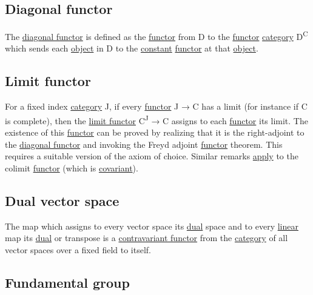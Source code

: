 \documentclass[11pt]{article}
\begin{document}
\subsection{\label{org6caafac}Diagonal functor}
\label{sec:org401c456}

The \hyperref[org6caafac]{diagonal functor} is defined as the \hyperref[orgf2f6841]{functor} from D to the \hyperref[orgf2f6841]{functor} \hyperref[org0450535]{category} D\textsuperscript{C} which sends each \hyperref[org4be0e9d]{object} in D to the \hyperref[org74b57ec]{constant} \hyperref[orgf2f6841]{functor} at that \hyperref[org4be0e9d]{object}.\\

\subsection{\label{org0e0b1d0}Limit functor}
\label{sec:org2031f86}

For a fixed index \hyperref[org0450535]{category} J, if every \hyperref[orgf2f6841]{functor} J → C has a limit (for instance if C is complete), then the \hyperref[org0e0b1d0]{limit functor} C\textsuperscript{J} → C assigns to each \hyperref[orgf2f6841]{functor} its limit. The existence of this \hyperref[orgf2f6841]{functor} can be proved by realizing that it is the right-adjoint to the \hyperref[org6caafac]{diagonal functor} and invoking the Freyd adjoint \hyperref[orgf2f6841]{functor} theorem. This requires a suitable version of the axiom of choice. Similar remarks \hyperref[org644adf5]{apply} to the colimit \hyperref[orgf2f6841]{functor} (which is \hyperref[org71a3b16]{covariant}).\\

\subsection{\label{orgeb5fdcf}Dual vector space}
\label{sec:org82c60a9}

The map which assigns to every vector space its \hyperref[org28cefbe]{dual} space and to every \hyperref[orgbbe89e9]{linear} map its \hyperref[org28cefbe]{dual} or transpose is a \hyperref[orge5e36a5]{contravariant functor} from the \hyperref[org0450535]{category} of all vector spaces over a fixed field to itself.\\

\subsection{\label{org3662161}Fundamental group}
\label{sec:orge989101}
\end{document}
